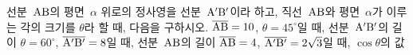 선분~$\mathrm{AB}$의 평면~$\alpha$ 위로의 정사영을 선분~$\mathrm{A'B'}$이라 하고, 직선~$\mathrm{AB}$와 평면~$\alpha$가 이루는 각의 크기를 $\theta$라 할 때, 다음을 구하시오.
 $\overline{\mathrm{AB}}=10$, $\theta=45^\circ$일 때, 선분~$\mathrm{A'B'}$의 길이
 $\theta=60^\circ$, $\overline{\mathrm{A'B'}}=8$일 때, 선분~$\mathrm{AB}$의 길이
 $\overline{\mathrm{AB}}=4$, $\overline{\mathrm{A'B'}}=2\sqrt{3}$일 때, $\cos\theta$의 값
